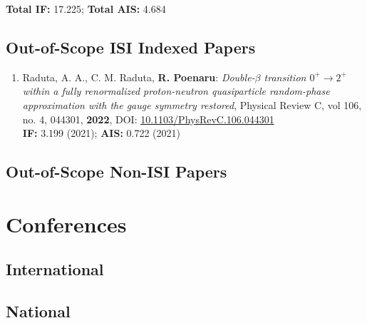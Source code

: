 
\textbf{Total IF:} 17.225; \textbf{Total AIS:} 4.684 

\subsection{Out-of-Scope ISI Indexed Papers}

\begin{enumerate}
    \item Raduta, A. A., C. M. Raduta, \textbf{R. Poenaru}: \emph{Double-$\beta$ transition $0^+\to2^+$ within a fully renormalized proton-neutron quasiparticle random-phase approximation with the gauge symmetry restored}, Physical Review C, vol 106, no. 4, 044301, \textbf{2022}, DOI: \href{https://journals.aps.org/prc/abstract/10.1103/PhysRevC.106.044301}{10.1103/PhysRevC.106.044301} \\
    \textbf{IF:} 3.199 (2021); \textbf{AIS:} 0.722 (2021)
\end{enumerate}

\subsection{Out-of-Scope Non-ISI Papers}

\section{Conferences}

\subsection{International}

\subsection{National}